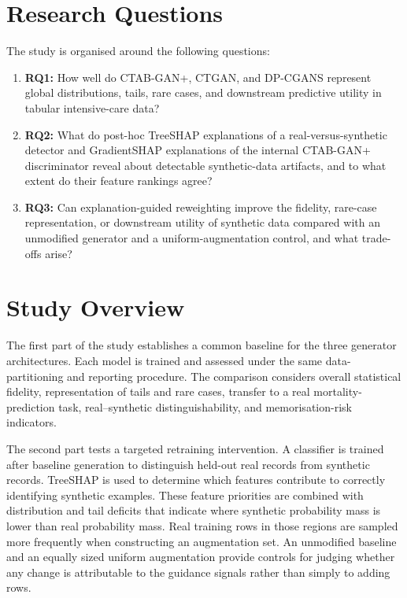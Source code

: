\section{Research Questions}

The study is organised around the following questions:

\begin{enumerate}
    \item \textbf{RQ1:} How well do CTAB-GAN+, CTGAN, and DP-CGANS represent
    global distributions, tails, rare cases, and downstream predictive
    utility in tabular intensive-care data?

    \item \textbf{RQ2:} What do post-hoc TreeSHAP explanations of a
    real-versus-synthetic detector and GradientSHAP explanations of the
    internal CTAB-GAN+ discriminator reveal about detectable synthetic-data
    artifacts, and to what extent do their feature rankings agree?

    \item \textbf{RQ3:} Can explanation-guided reweighting improve the
    fidelity, rare-case representation, or downstream utility of synthetic
    data compared with an unmodified generator and a uniform-augmentation
    control, and what trade-offs arise?
\end{enumerate}

\section{Study Overview}

The first part of the study establishes a common baseline for the three
generator architectures. Each model is trained and assessed under the same
data-partitioning and reporting procedure. The comparison considers overall
statistical fidelity, representation of tails and rare cases, transfer to a
real mortality-prediction task, real--synthetic distinguishability, and
memorisation-risk indicators.

The second part tests a targeted retraining intervention. A classifier is
trained after baseline generation to distinguish held-out real records from
synthetic records. TreeSHAP is used to determine which features contribute to
correctly identifying synthetic examples. These feature priorities are
combined with distribution and tail deficits that indicate where synthetic
probability mass is lower than real probability mass. Real training rows in
those regions are sampled more frequently when constructing an augmentation
set. An unmodified baseline and an equally sized uniform augmentation provide
controls for judging whether any change is attributable to the guidance
signals rather than simply to adding rows.

